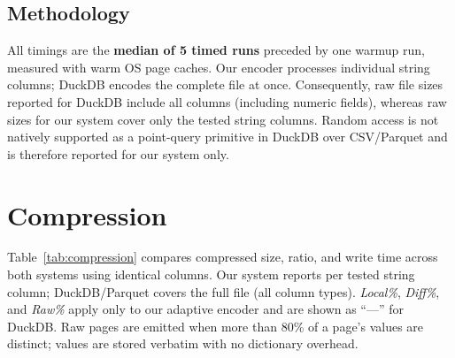 \documentclass[a4paper,11pt]{article}
\begin{document}
\subsection{Methodology}

All timings are the \textbf{median of 5 timed runs} preceded by one warmup
run, measured with warm OS page caches.
Our encoder processes individual string columns; DuckDB encodes the complete
file at once. Consequently, raw file sizes reported for DuckDB include all
columns (including numeric fields), whereas raw sizes for our system cover
only the tested string columns. Random access is not natively supported
as a point-query primitive in DuckDB over CSV/Parquet and is therefore
reported for our system only.

\newpage
\section{Compression}

Table~\ref{tab:compression} compares compressed size, ratio, and write
time across both systems using identical columns. Our system reports
per tested string column; DuckDB/Parquet covers the full file (all column
types). \emph{Local\%}, \emph{Diff\%}, and \emph{Raw\%} apply only to our
adaptive encoder and are shown as ``---'' for DuckDB. Raw pages are emitted
when more than 80\% of a page's values are distinct; values are stored
verbatim with no dictionary overhead.
\end{document}
